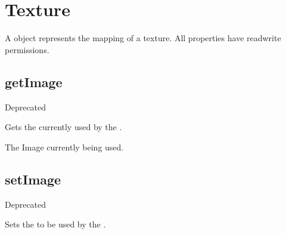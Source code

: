\documentclass[letterpaper,12pt,english,openany,oneside]{sphinxmanual}
\begin{document}
\section{Texture}
\label{\detokenize{JS_3D_API:texture}}
A  object represents the mapping of a texture. All  properties have read\sphinxhyphen{}write permissions.

\label{\detokenize{JS_3D_API:properties-31}}


\subsection{getImage}
\label{\detokenize{JS_3D_API:getimage-1}}\label{\detokenize{JS_3D_API:id38}}
Deprecated

Gets the  currently used by the .

\label{\detokenize{JS_3D_API:syntax-121}}

\begin{sphinxVerbatim}[commandchars=\\\{\}]
\end{sphinxVerbatim}
\label{\detokenize{JS_3D_API:returns-122}}

The Image currently being used.


\subsection{setImage}
\label{\detokenize{JS_3D_API:setimage-1}}\label{\detokenize{JS_3D_API:id39}}
Deprecated

Sets the  to be used by the .

\label{\detokenize{JS_3D_API:syntax-122}}

\begin{sphinxVerbatim}[commandchars=\\\{\}]
\end{sphinxVerbatim}
\label{\detokenize{JS_3D_API:parameters-87}}

\label{\detokenize{JS_3D_API:section-122}}\label{\detokenize{JS_3D_API:returns-123}}
\end{document}
